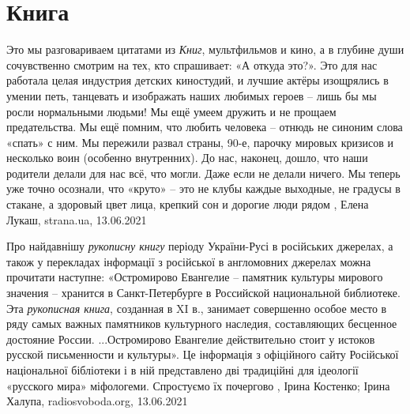  
 
 
 
 
\chapter{Книга}

Это мы разговариваем цитатами из \emph{Книг}, мультфильмов и кино, а в глубине души
сочувственно смотрим на тех, кто спрашивает: «А откуда это?».  Это для нас
работала целая индустрия детских киностудий, и лучшие актёры изощрялись в
умении петь, танцевать и изображать наших любимых героев – лишь бы мы росли
нормальными людьми!  Мы ещё умеем дружить и не прощаем предательства.  Мы ещё
помним, что любить человека – отнюдь не синоним слова «спать» с ним.  Мы
пережили развал страны, 90-е, парочку мировых кризисов и несколько воин
(особенно внутренних).  До нас, наконец, дошло, что наши родители делали для
нас всё, что могли. Даже если не делали ничего.  Мы теперь уже точно осознали,
что «круто» – это не клубы каждые выходные, не градусы в стакане, а здоровый
цвет лица, крепкий сон и дорогие люди рядом
, 
Елена Лукаш, strana.ua, 13.06.2021


Про найдавнішу \emph{рукописну книгу} періоду України-Русі в російських
джерелах, а також у перекладах інформації з російської в англомовних джерелах
можна прочитати наступне: «Остромирово Евангелие – памятник культуры мирового
значения – хранится в Санкт-Петербурге в Российской национальной библиотеке.
Эта \emph{рукописная книга}, созданная в XI в., занимает совершенно особое
место в ряду самых важных памятников культурного наследия, составляющих
бесценное достояние России.  ...Остромирово Евангелие действительно стоит у
истоков русской письменности и культуры». Це інформація з офіційного сайту
Російської національної бібліотеки і в ній представлено дві традиційні для
ідеології «русского мира» міфологеми. Спростуємо їх почергово
,
Ірина Костенко; Ірина Халупа, radiosvoboda.org, 13.06.2021

